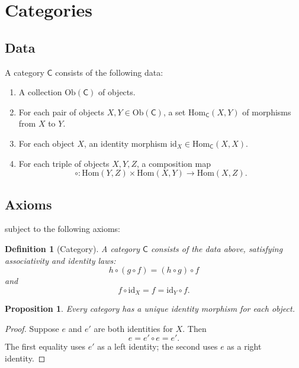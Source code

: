 \documentclass[a4paper]{article}
\newtheorem{definition}[theorem]{Definition}
\newtheorem{proposition}[theorem]{Proposition}
\theoremstyle{remark}
\begin{document}
\section{Categories}

\subsection{Data}

A category $\mathsf{C}$ consists of the following data:
\begin{enumerate}
  \item A collection $\mathrm{Ob}(\mathsf{C})$ of objects.
  \item For each pair of objects $X, Y \in \mathrm{Ob}(\mathsf{C})$,
    a set $\mathrm{Hom}_{\mathsf{C}}(X, Y)$ of morphisms from $X$ to $Y$.
  \item For each object $X$, an identity morphism
    $\mathrm{id}_X \in \mathrm{Hom}_{\mathsf{C}}(X, X)$.
  \item For each triple of objects $X, Y, Z$, a composition map
    \begin{equation}
      \circ \colon \mathrm{Hom}(Y, Z) \times \mathrm{Hom}(X, Y)
        \to \mathrm{Hom}(X, Z).
    \end{equation}
\end{enumerate}

\subsection{Axioms}

subject to the following axioms:

\begin{definition}[Category]
A \emph{category} $\mathsf{C}$ consists of the data above,
satisfying associativity and identity laws:
\begin{equation}
  h \circ (g \circ f) = (h \circ g) \circ f
\end{equation}
and
\begin{equation*}
  f \circ \mathrm{id}_X = f = \mathrm{id}_Y \circ f.
\end{equation*}
\end{definition}

\begin{proposition}
Every category has a unique identity morphism for each object.
\end{proposition}

\begin{proof}
Suppose $e$ and $e'$ are both identities for $X$.  Then
\[
  e = e' \circ e = e'.
\]
The first equality uses $e'$ as a left identity; the second
uses $e$ as a right identity.
\end{proof}
\end{document}
